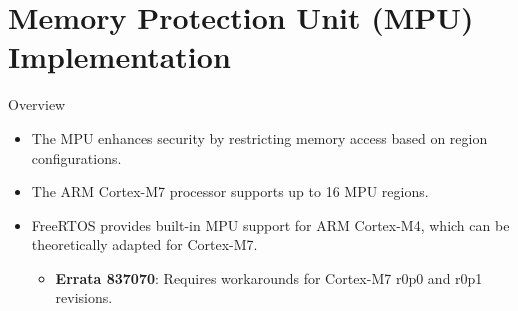 
\section{Memory Protection Unit (MPU) Implementation}

\begin{frame}{Overview}
    \begin{itemize}
        \item The MPU enhances security by restricting memory access based on region configurations.
        \item The ARM Cortex-M7 processor supports up to 16 MPU regions.
        \item FreeRTOS provides built-in MPU support for ARM Cortex-M4, which can be theoretically adapted for Cortex-M7.
        \begin{itemize}
            \item \textbf{Errata 837070}: Requires workarounds for Cortex-M7 r0p0 and r0p1 revisions. 
        \end{itemize}
    \end{itemize}
\end{frame}

